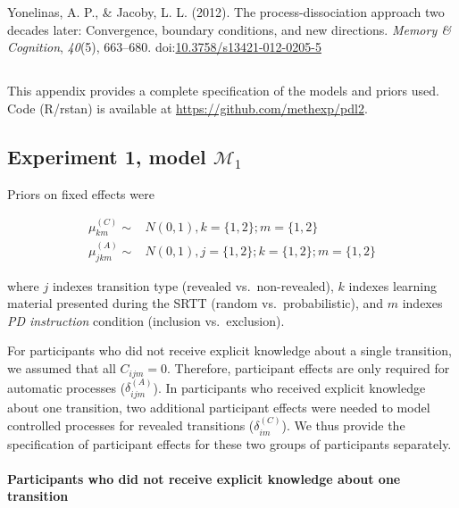 \documentclass[floatsintext,man]{apa6}
\begin{document}
\hypertarget{ref-yonelinasux5fprocess-dissociationux5f2012}{}
Yonelinas, A. P., \& Jacoby, L. L. (2012). The process-dissociation
approach two decades later: Convergence, boundary conditions, and new
directions. \emph{Memory \& Cognition}, \emph{40}(5), 663--680.
doi:\href{https://doi.org/10.3758/s13421-012-0205-5}{10.3758/s13421-012-0205-5}




  \begin{appendix}
  \section{}
  This appendix provides a complete specification of the models and priors
  used. Code (R/rstan) is available at
  \url{https://github.com/methexp/pdl2}.
  
  \subsection{\texorpdfstring{Experiment 1, model
  \(\mathcal{M}_1\)}{Experiment 1, model \textbackslash{}mathcal\{M\}\_1}}\label{experiment-1-model-mathcalmux5f1}
  
  Priors on fixed effects were
  
  \[
  \begin{aligned}
  \mu_{km}^{(C)} \sim & N(0, 1), k = \lbrace 1, 2 \rbrace; m = \lbrace 1, 2 \rbrace\\
  \mu_{jkm}^{(A)} \sim & N(0, 1), j = \lbrace 1, 2 \rbrace; k = \lbrace 1, 2 \rbrace; m = \lbrace 1, 2 \rbrace
  \end{aligned}
  \]
  
  where \(j\) indexes transition type (revealed vs.~non-revealed), \(k\)
  indexes learning material presented during the SRTT (random
  vs.~probabilistic), and \(m\) indexes \emph{PD instruction} condition
  (inclusion vs.~exclusion).
  
  For participants who did not receive explicit knowledge about a single
  transition, we assumed that all \(C_{ijm} = 0\). Therefore, participant
  effects are only required for automatic processes
  (\(\delta_{ijm}^{(A)}\)). In participants who received explicit
  knowledge about one transition, two additional participant effects were
  needed to model controlled processes for revealed transitions
  (\(\delta_{im}^{(C)}\)). We thus provide the specification of
  participant effects for these two groups of participants separately.
  
  \paragraph{Participants who did not receive explicit knowledge about one
  transition}\label{participants-who-did-not-receive-explicit-knowledge-about-one-transition}
  

\end{appendix}
\end{document}
